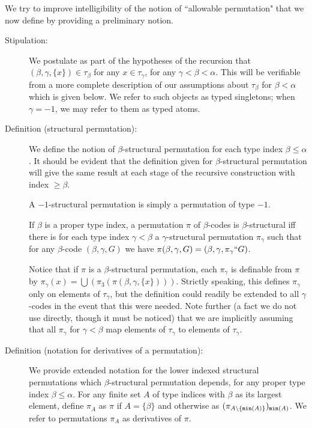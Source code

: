 \documentclass[112pt]{article}
\begin{document}
We try to improve intelligibility of the notion of ``allowable permutation" that we now define by providing a preliminary notion.

\begin{description}

\item[Stipulation:]  We postulate as part of the hypotheses of the recursion that $(\beta,\gamma,\{x\}) \in \tau_\beta$ for any $x \in \tau_\gamma$, for any $\gamma<\beta<\alpha$.  This will be verifiable from a more complete description of our assumptions about $\tau_\beta$ for $\beta<\alpha$ which is given below.  We refer to such objects as typed singletons;  when $\gamma=-1$, we may refer to them as typed atoms.

\item[Definition (structural permutation):]  We define the notion of $\beta$-structural permutation for each type index $\beta \leq \alpha$.  It should be evident that the definition given for $\beta$-structural permutation will give the same result at each stage of the recursive construction with index $\geq \beta$.

A $-1$-structural permutation is simply a permutation of type $-1$.

If $\beta$ is a proper type index, a permutation $\pi$ of $\beta$-codes is $\beta$-structural iff there is for each type index $\gamma<\beta$ a
$\gamma$-structural permutation $\pi_\gamma$ such that for any $\beta$-code $(\beta,\gamma,G)$ we have $\pi(\beta,\gamma,G) = (\beta,\gamma,\pi_\gamma``G)$.

Notice that if $\pi$ is a $\beta$-structural permutation, each $\pi_\gamma$ is definable from $\pi$ by $\pi_\gamma(x) = \bigcup(\pi_3(\pi(\beta,\gamma,\{x\})))$.  Strictly speaking, this defines $\pi_\gamma$ only on elements of $\tau_\gamma$, but the definition could readily be extended to all $\gamma$-codes in the event that this were needed.  Note further (a fact we do not use directly, though it must be noticed) that we are implicitly assuming that all $\pi_\gamma$ for $\gamma<\beta$
map elements of $\tau_\gamma$ to elements of $\tau_\gamma$.

\item[Definition (notation for derivatives of a permutation):] We provide extended notation for the lower indexed structural  permutations which  $\beta$-structural permutation depends, for any proper type index $\beta \leq \alpha$.
For any finite set $A$ of type indices with $\beta$ as its largest element, define $\pi_A$ as $\pi$ if $A = \{\beta\}$
and otherwise as $(\pi_{A \setminus \{{\tt min}(A)\}})_{{\tt min}(A)}$.  We refer to permutations $\pi_A$ as derivatives of $\pi$.


\end{description}
\end{document}
